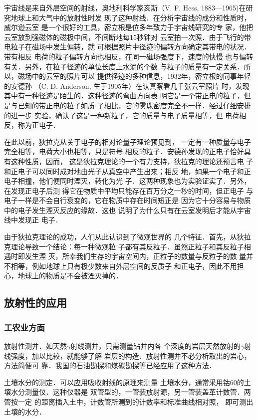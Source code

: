 宇宙线是来自外层空间的射线，奥地利科学家亥斯（V. 
F. Hess, 1883—1965)在研究地球上和大气中的放射性时发
现了这种射线．在分析宇宙线的成分和性质时，威尔逊云室
是一个很好的工具，密立根是位多年致力于宇宙线研究的专
家，他把云室放到强磁体的磁极中间，不间断地每15秒钟对
云室拍一次照．由于飞行的带电粒子在磁场中发生偏转，就
可根据照片中径迹的偏转方向确定其带电的状况．带有相反
电荷的粒子偏转方向也相反，在同一磁场强度下，速度的快慢
也与偏转有关．另外，在粒子径迹的单位长度上水滴的个数
与粒子的质量有一定关系．所以，磁场中的云室的照片可以
提供径迹的多种信息，1932年，密立根的同事年轻的安德孙
（C. D. Anderson, 生于1905年）在认真察看几千张云室照片
时，发现其中有一种径迹是陌生的．这种径迹的弯曲方向表
明它是一个带正电的粒子，但是与已知的带正电的粒子如质
子相比，它的雾珠密度完全不一样．经过仔细安排的进一步
实验，确认了这是一种新粒子，它的质量与电子质量相等，但
电荷相反，称为正电子．

在此以前，狄拉克从关于电子的相对论量子理论预见到，
一定有一种质量与电子完全相等，电荷大小也相等，只是符号
相反的粒子．安德孙发现的正电子恰好具有这种性质，因而，
这是狄拉克理论的一个有力支持，狄拉克的理论还预言电
子和正电子可以同时成对地由光子从真空中产生出来；相反
地，如果一个电子和正电子相撞，他们便同时湮灭，转化为光
子．这两种现象也为实验证实了．另外，在发现正电子后测
得它在物质中平均只能存在百万分之一秒的时间，但正电子
与电子一样是不会自行衰变的，它在物质中存在时间短正是
因为它十分容易与物质中的电子发生湮灭反应的缘故．这也
说明了为什么只有在云室发明后才能从宇宙线中发现正
电子．

由于狄拉克理论的成功，人们从此认识到了微观世界的
几个特征．首先，从狄拉克理论导致一个结论：每一种微观粒
子都有其反粒子．虽然正粒子和其反粒子相遇时即发生湮
灭，所幸我们生存的宇宙空间内，正粒子的数量与反粒子的数
量并不相等，例如地球上只有极少数来自外层空间的反质子
和正电子，因此不用担心，地球上的物质是不会被湮灭掉的．

\subsection{放射性的应用}
\subsubsection{工农业方面}
放射性测井．如天然$\gamma$射线测井，只需测量钻井内各
个深度的岩层天然放射的$\gamma$射线强度，加以比较，就能够了解
岩层的构造．放射性测井不必分析取出的岩心，方法简便可
靠．我国的石油勘探和煤碳勘探等已经应用了这种方法．

土壤水分的测定．可以应用吸收射线的原理来测量
土壤水分，通常采用钴60的土壤水分测量仪．这种仪器是
双管型的，一管装放射源，另一管装盖革计数管．两管按一定
的距离插入土中，计数管所测到的计数率和标准曲线相对照，
即可测出土壤的水分．

